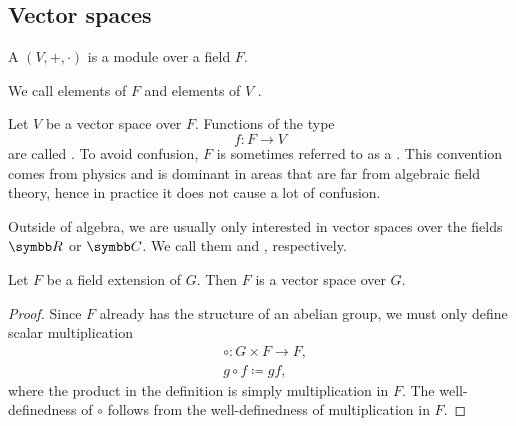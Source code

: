 \subsection{Vector spaces}\label{subsec:vector_spaces}

\begin{definition}\label{def:vector_space}
  A  \( (V, +, \cdot) \) is a module over a field \( F \).

  We call elements of \( F \)  and elements of \( V \) .
\end{definition}

\begin{definition}\label{def:vector_field}
  Let \( V \) be a vector space over \( F \). Functions of the type
  \begin{equation*}
    f: F \to V
  \end{equation*}
  are called . To avoid confusion, \( F \) is sometimes referred to as a . This convention comes from physics and is dominant in areas that are far from algebraic field theory, hence in practice it does not cause a lot of confusion.
\end{definition}

\begin{remark}\label{remark:real_vector_space}
  Outside of algebra, we are usually only interested in vector spaces over the fields \( \R \) or \( \BB{C} \). We call them  and , respectively.
\end{remark}

\begin{proposition}\label{thm:field_extension_is_vector_space}
  Let \( F \) be a field extension of \( G \). Then \( F \) is a vector space over \( G \).
\end{proposition}
\begin{proof}
  Since \( F \) already has the structure of an abelian group, we must only define scalar multiplication
  \begin{align*}
    &\circ: G \times F \to F, \\
    &g \circ f \coloneqq gf,
  \end{align*}
  where the product in the definition is simply multiplication in \( F \). The well-definedness of \( \circ \) follows from the well-definedness of multiplication in \( F \).
\end{proof}

